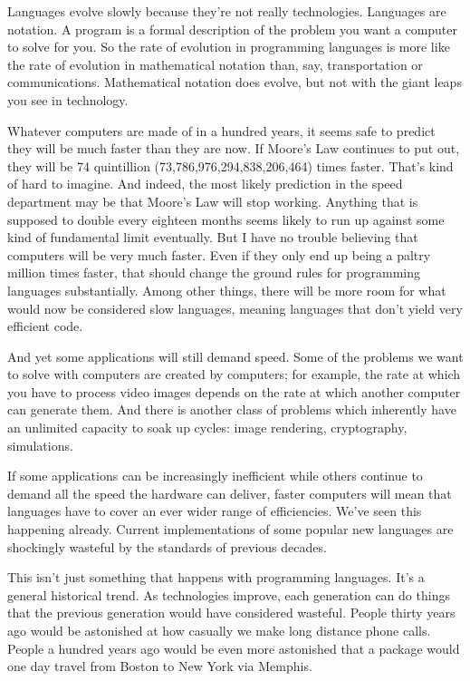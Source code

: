 \documentclass[12pt]{book}
\begin{document}
Languages evolve slowly because they're not really technologies.
Languages are notation. A program is a formal description of the problem
you want a computer to solve for you. So the rate of evolution in
programming languages is more like the rate of evolution in mathematical
notation than, say, transportation or communications. Mathematical
notation does evolve, but not with the giant leaps you see in
technology.

Whatever computers are made of in a hundred years, it seems safe to
predict they will be much faster than they are now. If Moore's Law
continues to put out, they will be 74 quintillion
(73,786,976,294,838,206,464) times faster. That's kind of hard to
imagine. And indeed, the most likely prediction in the speed department
may be that Moore's Law will stop working. Anything that is supposed to
double every eighteen months seems likely to run up against some kind of
fundamental limit eventually. But I have no trouble believing that
computers will be very much faster. Even if they only end up being a
paltry million times faster, that should change the ground rules for
programming languages substantially. Among other things, there will be
more room for what would now be considered slow languages, meaning
languages that don't yield very efficient code.

And yet some applications will still demand speed. Some of the problems
we want to solve with computers are created by computers; for example,
the rate at which you have to process video images depends on the rate
at which another computer can generate them. And there is another class
of problems which inherently have an unlimited capacity to soak up
cycles: image rendering, cryptography, simulations.

If some applications can be increasingly inefficient while others
continue to demand all the speed the hardware can deliver, faster
computers will mean that languages have to cover an ever wider range of
efficiencies. We've seen this happening already. Current implementations
of some popular new languages are shockingly wasteful by the standards
of previous decades.

This isn't just something that happens with programming languages. It's
a general historical trend. As technologies improve, each generation can
do things that the previous generation would have considered wasteful.
People thirty years ago would be astonished at how casually we make long
distance phone calls. People a hundred years ago would be even more
astonished that a package would one day travel from Boston to New York
via Memphis.
\end{document}
